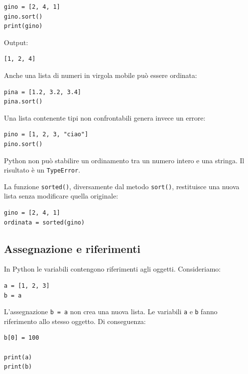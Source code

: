 \documentclass[11pt,a4paper]{book}
\begin{document}
\begin{lstlisting}[style=python]
gino = [2, 4, 1]
gino.sort()
print(gino)
\end{lstlisting}

Output:

\begin{lstlisting}[style=python, numbers=none]
[1, 2, 4]
\end{lstlisting}

Anche una lista di numeri in virgola mobile può essere ordinata:

\begin{lstlisting}[style=python]
pina = [1.2, 3.2, 3.4]
pina.sort()
\end{lstlisting}

Una lista contenente tipi non confrontabili genera invece un errore:

\begin{lstlisting}[style=python]
pino = [1, 2, 3, "ciao"]
pino.sort()
\end{lstlisting}

Python non può stabilire un ordinamento tra un numero intero e una stringa. Il risultato è un \texttt{TypeError}.

La funzione \texttt{sorted()}, diversamente dal metodo \texttt{sort()}, restituisce una nuova lista senza modificare quella originale:

\begin{lstlisting}[style=python]
gino = [2, 4, 1]
ordinata = sorted(gino)
\end{lstlisting}

\subsection{Assegnazione e riferimenti}

In Python le variabili contengono riferimenti agli oggetti. Consideriamo:

\begin{lstlisting}[style=python]
a = [1, 2, 3]
b = a
\end{lstlisting}

L'assegnazione \texttt{b = a} non crea una nuova lista. Le variabili \texttt{a} e \texttt{b} fanno riferimento allo stesso oggetto. Di conseguenza:

\begin{lstlisting}[style=python]
b[0] = 100

print(a)
print(b)
\end{lstlisting}
\end{document}

